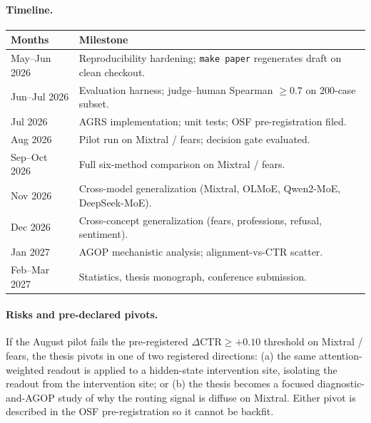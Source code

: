 \documentclass[11pt]{article}
\begin{document}
\paragraph{Timeline.}
\begin{center}\small
\begin{tabular}{ll}
\toprule
\textbf{Months} & \textbf{Milestone} \\
\midrule
May--Jun 2026 & Reproducibility hardening; \texttt{make paper} regenerates draft on clean checkout. \\
Jun--Jul 2026 & Evaluation harness; judge--human Spearman $\geq 0.7$ on $200$-case subset. \\
Jul 2026      & AGRS implementation; unit tests; OSF pre-registration filed. \\
Aug 2026      & Pilot run on Mixtral / fears; decision gate evaluated. \\
Sep--Oct 2026 & Full six-method comparison on Mixtral / fears. \\
Nov 2026      & Cross-model generalization (Mixtral, OLMoE, Qwen2-MoE, DeepSeek-MoE). \\
Dec 2026      & Cross-concept generalization (fears, professions, refusal, sentiment). \\
Jan 2027      & AGOP mechanistic analysis; alignment-vs-CTR scatter. \\
Feb--Mar 2027 & Statistics, thesis monograph, conference submission. \\
\bottomrule
\end{tabular}
\end{center}

\paragraph{Risks and pre-declared pivots.}
If the August pilot fails the pre-registered $\Delta\text{CTR}
\geq +0.10$ threshold on Mixtral / fears, the thesis pivots in one
of two registered directions: (a) the same attention-weighted
readout is applied to a hidden-state intervention site, isolating
the readout from the intervention site; or (b) the thesis becomes
a focused diagnostic-and-AGOP study of why the routing signal is
diffuse on Mixtral. Either pivot is described in the OSF
pre-registration so it cannot be backfit.
\end{document}
